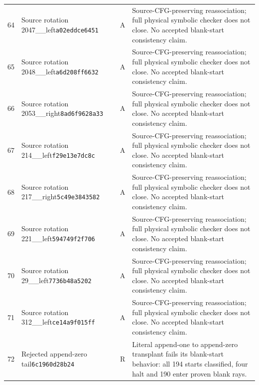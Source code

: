 \begin{longtable}{@{}rp{}cp{}@{}}
64 & Source rotation 2047\_\allowbreak 2053\_\allowbreak left\newline\texttt{a02eddce6451} & A & Source-CFG-preserving reassociation; full physical symbolic checker does not close. No accepted blank-start consistency claim.\\[5pt]
65 & Source rotation 2048\_\allowbreak 2049\_\allowbreak left\newline\texttt{a6d208ff6632} & A & Source-CFG-preserving reassociation; full physical symbolic checker does not close. No accepted blank-start consistency claim.\\[5pt]
66 & Source rotation 2053\_\allowbreak 2054\_\allowbreak right\newline\texttt{8ad6f9628a33} & A & Source-CFG-preserving reassociation; full physical symbolic checker does not close. No accepted blank-start consistency claim.\\[5pt]
67 & Source rotation 214\_\allowbreak 312\_\allowbreak left\newline\texttt{f29e13e7dc8c} & A & Source-CFG-preserving reassociation; full physical symbolic checker does not close. No accepted blank-start consistency claim.\\[5pt]
68 & Source rotation 217\_\allowbreak 197\_\allowbreak right\newline\texttt{5c49e3843582} & A & Source-CFG-preserving reassociation; full physical symbolic checker does not close. No accepted blank-start consistency claim.\\[5pt]
69 & Source rotation 221\_\allowbreak 217\_\allowbreak left\newline\texttt{594749f2f706} & A & Source-CFG-preserving reassociation; full physical symbolic checker does not close. No accepted blank-start consistency claim.\\[5pt]
70 & Source rotation 29\_\allowbreak 44\_\allowbreak left\newline\texttt{7736b48a5202} & A & Source-CFG-preserving reassociation; full physical symbolic checker does not close. No accepted blank-start consistency claim.\\[5pt]
71 & Source rotation 312\_\allowbreak 38\_\allowbreak left\newline\texttt{ce14a9f015ff} & A & Source-CFG-preserving reassociation; full physical symbolic checker does not close. No accepted blank-start consistency claim.\\[5pt]
72 & Rejected append-zero tail\newline\texttt{6c1960d28b24} & R & Literal append-one to append-zero transplant fails its blank-start behavior: all 194 starts classified, four halt and 190 enter proven blank rays.\\[5pt]

\end{longtable}
